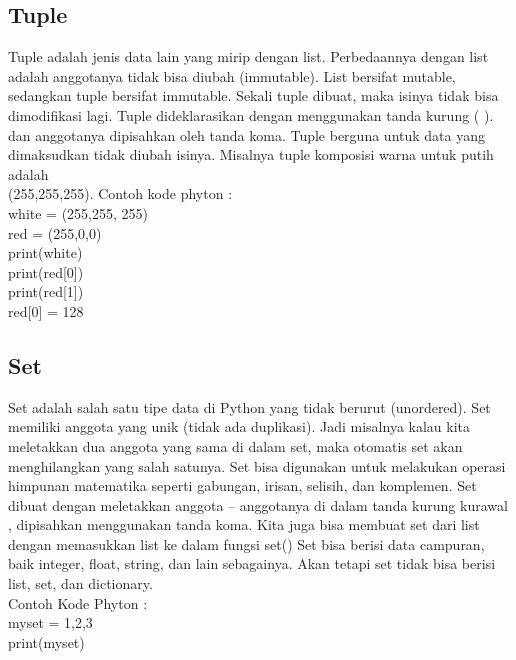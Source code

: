 \subsection{Tuple}
Tuple adalah jenis data lain yang mirip dengan list. Perbedaannya dengan list adalah anggotanya tidak bisa diubah (immutable). List bersifat mutable, sedangkan tuple bersifat immutable. Sekali tuple dibuat, maka isinya tidak bisa dimodifikasi lagi. Tuple dideklarasikan dengan menggunakan tanda kurung ( ). dan anggotanya dipisahkan oleh tanda koma. Tuple berguna untuk data yang dimaksudkan tidak diubah isinya. Misalnya tuple komposisi warna untuk putih adalah\\ (255,255,255).
Contoh kode phyton :\\
white = (255,255, 255)\\
red = (255,0,0)\\
print(white)\\
print(red[0])\\
print(red[1])\\
red[0] = 128\\

\subsection{Set}
Set adalah salah satu tipe data di Python yang tidak berurut (unordered). Set memiliki anggota yang unik (tidak ada duplikasi). Jadi misalnya kalau kita meletakkan dua anggota yang sama di dalam set, maka otomatis set akan menghilangkan yang salah satunya. Set bisa digunakan untuk melakukan operasi himpunan matematika seperti gabungan, irisan, selisih, dan komplemen. Set dibuat dengan meletakkan anggota – anggotanya di dalam tanda kurung kurawal { }, dipisahkan menggunakan tanda koma. Kita juga bisa membuat set dari list dengan memasukkan list ke dalam fungsi set() Set bisa berisi data campuran, baik integer, float, string, dan lain sebagainya. Akan tetapi set tidak bisa berisi list, set, dan dictionary.\\
Contoh Kode Phyton : \\
myset = {1,2,3} \\
print(myset) \\

